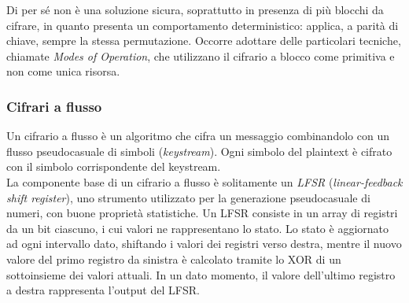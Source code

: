 \documentclass[target=bach,aauheader=,style=]{thud}
\begin{document}
            Di per sé non è una soluzione sicura, soprattutto in presenza di più blocchi da cifrare, in quanto presenta un comportamento deterministico: applica, a parità di chiave, sempre la stessa permutazione. Occorre adottare delle particolari tecniche, chiamate \textit{Modes of Operation}, che utilizzano il cifrario a blocco come primitiva e non come unica risorsa. \cite{handcypto, computernet}
            
            \subsubsection{Cifrari a flusso}
            Un cifrario a flusso è un algoritmo che cifra un messaggio combinandolo con un flusso pseudocasuale di simboli (\textit{keystream}). Ogni simbolo del plaintext è cifrato con il simbolo corrispondente del keystream.\\
            La componente base di un cifrario a flusso è solitamente un \textit{LFSR} (\textit{linear-feedback shift register}), uno strumento utilizzato per la generazione pseudocasuale di numeri, con buone proprietà statistiche. Un LFSR consiste in un array di registri da un bit ciascuno, i cui valori ne rappresentano lo stato. Lo stato è aggiornato ad ogni intervallo dato, shiftando i valori dei registri verso destra, mentre il nuovo valore del primo registro da sinistra è calcolato tramite lo XOR di un sottoinsieme dei valori attuali. In un dato momento, il valore dell'ultimo registro a destra rappresenta l'output del LFSR.\cite{moderncrypto}
\end{document}
